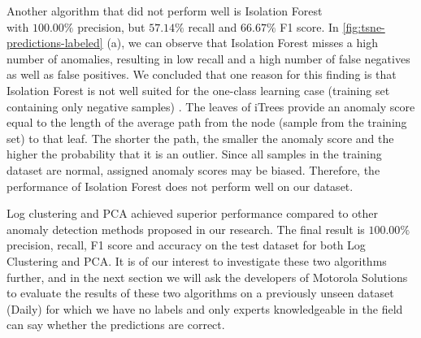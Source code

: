 Another algorithm that did not perform well is Isolation Forest\\ with $100.00\%$ precision, but $57.14\%$ recall and $66.67\%$ F1 score. In \ref{fig:tsne-predictions-labeled} (a), we can observe that Isolation Forest misses a high number of anomalies, resulting in low recall and a high number of false negatives as well as false positives. We concluded that one reason for this finding is that Isolation Forest is not well suited for the one-class learning case (training set containing only negative samples) \cite{adForest}. The leaves of iTrees provide an anomaly score equal to the length of the average path from the node (sample from the training set) to that leaf. The shorter the path, the smaller the anomaly score and the higher the probability that it is an outlier. Since all samples in the training dataset are normal, assigned anomaly scores may be biased. Therefore, the performance of Isolation Forest does not perform well on our dataset.

Log clustering and PCA achieved superior performance compared to other anomaly detection methods proposed in our research. The final result is $100.00\%$ precision, recall, F1 score and accuracy on the test dataset for both Log Clustering and PCA. It is of our interest to investigate these two algorithms further, and in the next section we will ask the developers of Motorola Solutions to evaluate the results of these two algorithms on a previously unseen dataset (Daily) for which we have no labels and only experts knowledgeable in the field can say whether the predictions are correct.  

